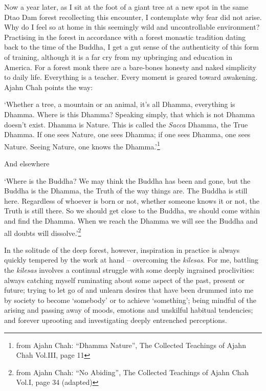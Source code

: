 Now a year later, as I sit at the foot of a giant tree at a new spot in
the same Dtao Dam forest recollecting this encounter, I contemplate why
fear did not arise. Why do I feel so at home in this seemingly wild and
uncontrollable environment? Practising in the forest in accordance with
a forest monastic tradition dating back to the time of the Buddha, I get
a gut sense of the authenticity of this form of training, although it is
a far cry from my upbringing and education in America. For a forest monk
there are a bare-bones honesty and naked simplicity to daily life.
Everything is a teacher. Every moment is geared toward awakening. Ajahn
Chah points the way:

`Whether a tree, a mountain or an animal, it's all Dhamma, everything is
Dhamma. Where is this Dhamma? Speaking simply, that which is not Dhamma
doesn't exist. Dhamma is Nature. This is called the \emph{Sacca} Dhamma,
the True Dhamma. If one sees Nature, one sees Dhamma; if one sees
Dhamma, one sees Nature. Seeing Nature, one knows the Dhamma.'\footnote{from
  Ajahn Chah: ``Dhamma Nature'', The Collected Teachings of Ajahn Chah
  Vol.III, page 11}

And elsewhere

`Where is the Buddha? We may think the Buddha has been and gone, but the
Buddha is the Dhamma, the Truth of the way things are. The Buddha is
still here. Regardless of whoever is born or not, whether someone knows
it or not, the Truth is still there. So we should get close to the
Buddha, we should come within and find the Dhamma. When we reach the
Dhamma we will see the Buddha and all doubts will dissolve.'\footnote{from
  Ajahn Chah: ``No Abiding'', The Collected Teachings of Ajahn Chah
  Vol.I, page 34 (adapted)}

In the solitude of the deep forest, however, inspiration in practice is
always quickly tempered by the work at hand -- overcoming the
\emph{kilesas}. For me, battling the \emph{kilesas} involves a continual
struggle with some deeply ingrained proclivities: always catching myself
ruminating about some aspect of the past, present or future; trying to
let go of and unlearn desires that have been drummed into me by society
to become `somebody' or to achieve `something'; being mindful of the
arising and passing away of moods, emotions and unskilful habitual
tendencies; and forever uprooting and investigating deeply entrenched
perceptions.


